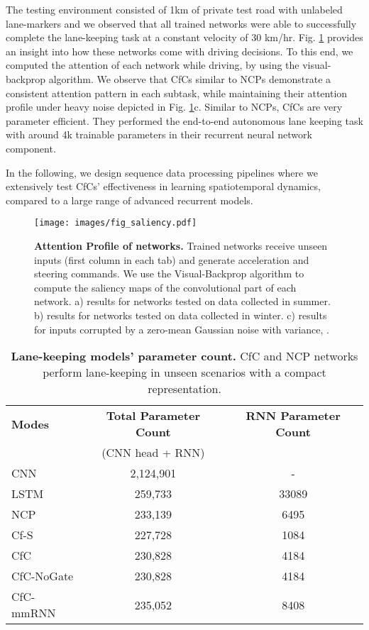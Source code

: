 \documentclass[12pt]{article}
\begin{document}
The testing environment consisted of 1km of private test road with unlabeled lane-markers and we observed that all trained networks were able to successfully complete the lane-keeping task at a constant velocity of 30 km/hr. Fig. \ref{fig:saliency} provides an insight into how these networks come with driving decisions. To this end, we computed the attention of each network while driving, by using the visual-backprop algorithm\cite{bojarski2018visualbackprop}. We observe that CfCs similar to NCPs demonstrate a consistent attention pattern in each subtask, while maintaining their attention profile under heavy noise depicted in Fig. \ref{fig:saliency}c. Similar to NCPs, CfCs are very parameter efficient. They performed the end-to-end autonomous lane keeping task with around 4k trainable parameters in their recurrent neural network component.

In the following, we design sequence data processing pipelines where we extensively test CfCs' effectiveness in learning spatiotemporal dynamics, compared to a large range of advanced recurrent models. 

\begin{figure}[t]
	\centering
	\texttt{[image: images/fig\_saliency.pdf]}
	\caption{\textbf{Attention Profile of networks.} Trained networks receive unseen inputs (first column in each tab) and generate acceleration and steering commands. We use the Visual-Backprop algorithm \cite{bojarski2018visualbackprop} to compute the saliency maps of the convolutional part of each network. a) results for networks tested on data collected in summer. b) results for networks tested on data collected in winter. c) results for inputs corrupted by a zero-mean Gaussian noise with variance, .}
	\label{fig:saliency}
\end{figure}

\begin{table}[t]
    \centering
        \caption{\textbf{Lane-keeping models' parameter count.} CfC and NCP networks perform lane-keeping in unseen scenarios with a compact representation.}
    \begin{tabular}{lcc}
    \toprule
        \textbf{Modes} &  \textbf{Total Parameter Count} & \textbf{RNN Parameter Count}\\
        & (CNN head + RNN) & \\
         \midrule
CNN & 2,124,901 & - \\
LSTM & 259,733 & 33089 \\
NCP & 233,139 & 6495 \\
Cf-S & 227,728 & 1084 \\
CfC & 230,828 & 4184\\
CfC-NoGate & 230,828 & 4184\\
CfC-mmRNN & 235,052 & 8408 \\
         \bottomrule
    \end{tabular}
    \label{tab:param_count}
\end{table}
\end{document}
